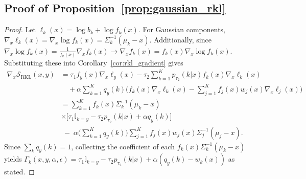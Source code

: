 \documentclass{article}
\begin{document}
\subsection{Proof of Proposition~\ref{prop:gaussian_rkl}}
\label{app:proof_gaussian}
\begin{proof}
Let $\ell_k(x)=\log b_k+\log f_k(x)$. For Gaussian components, $
\nabla_x \ell_k(x)=\nabla_x \log f_k(x)=\Sigma_k^{-1}(\mu_k-x)$. Additionally, since $\nabla_x \log f_k(x) = \frac{1}{f_k(x)} \nabla_x f_k(x) \rightarrow \nabla_x f_k(x) = f_k(x) \nabla_x \log f_k(x) $. Substituting these into Corollary~\ref{cor:rkl_gradient} gives
{\fontsize{8.5}{10}\selectfont
\begin{equation}
\begin{aligned}
\nabla_x \mathcal{S}_{\text{RKL}}(x, y)
&= \tau_1 f_y(x) \nabla_x \ell_y(x) - \tau_2 \sum_{k=1}^K p_{\tau_2}(k|x) f_k(x) \nabla_x \ell_k(x) \\
&\quad + \alpha \sum_{k=1}^K q_y(k) \Big(  f_k(x) \nabla_x \ell_k(x) - \sum_{j=1}^K  f_j(x)  w_j(x)\nabla_x \ell_j(x)\Big) \\
&= \sum_{k=1}^K  f_k(x) \Sigma_k^{-1}(\mu_k-x)\\ &\times\Big[\tau_1\mathbb{I}_{k=y}-\tau_2 p_{\tau_2}(k|x)+\alpha q_y(k)\Big] \\ &
     \;-\;\alpha\Big(\sum_{k=1}^K q_y(k)\Big)\sum_{j=1}^K f_j(x) w_j(x)\Sigma_j^{-1}(\mu_j-x).
\end{aligned}
\end{equation}}
Since $\sum_k q_y(k)=1$, collecting the coefficient of each $ f_k(x) \Sigma_k^{-1}(\mu_k-x)$ yields
$\Gamma_k(x,y,\alpha,\epsilon)=\tau_1\mathbb{I}_{k=y}-\tau_2 p_{\tau_2}(k|x)+\alpha(q_y(k)-w_k(x))$ as stated.
\end{proof}
\end{document}
